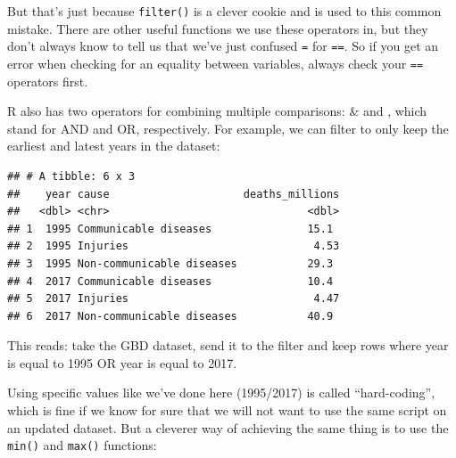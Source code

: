 \documentclass[
  12pt,
  krantz2]{krantz}
\makeatletter
\newenvironment{Shaded}{\begin{snugshade}}{\end{snugshade}}
\newcommand{\DecValTok}[1]{\textcolor[rgb]{0.00,0.00,0.81}{#1}}
\newcommand{\KeywordTok}[1]{\textcolor[rgb]{0.13,0.29,0.53}{\textbf{#1}}}
\newcommand{\NormalTok}[1]{#1}
\newcommand{\OperatorTok}[1]{\textcolor[rgb]{0.81,0.36,0.00}{\textbf{#1}}}
\newcommand{\StringTok}[1]{\textcolor[rgb]{0.31,0.60,0.02}{#1}}
\newenvironment{kframe}{%
\medskip{}
\setlength{\fboxsep}{.8em}
 \def\at@end@of@kframe{}%
 \ifinner\ifhmode%
  \def\at@end@of@kframe{\end{minipage}}%
  \begin{minipage}{\columnwidth}%
 \fi\fi%
 \def\FrameCommand##1{\hskip\@totalleftmargin \hskip-\fboxsep
 \colorbox{shadecolor}{##1}\hskip-\fboxsep
     \hskip-\linewidth \hskip-\@totalleftmargin \hskip\columnwidth}%
 \MakeFramed {\advance\hsize-\width
   \@totalleftmargin\z@ \linewidth\hsize
   \@setminipage}}%
 {\par\unskip\endMakeFramed%
 \at@end@of@kframe}
\renewenvironment{Shaded}{\begin{kframe}}{\end{kframe}}
\makeatother
\begin{document}
But that's just because \texttt{filter()} is a clever cookie and is used to this common mistake.
There are other useful functions we use these operators in, but they don't always know to tell us that we've just confused \texttt{=} for \texttt{==}.
So if you get an error when checking for an equality between variables, always check your \texttt{==} operators first.

R also has two operators for combining multiple comparisons: \& and \textbar, which stand for AND and OR, respectively.
For example, we can filter to only keep the earliest and latest years in the dataset:

\begin{Shaded}
\end{Shaded}

\begin{verbatim}
## # A tibble: 6 x 3
##    year cause                     deaths_millions
##   <dbl> <chr>                               <dbl>
## 1  1995 Communicable diseases               15.1 
## 2  1995 Injuries                             4.53
## 3  1995 Non-communicable diseases           29.3 
## 4  2017 Communicable diseases               10.4 
## 5  2017 Injuries                             4.47
## 6  2017 Non-communicable diseases           40.9
\end{verbatim}

This reads: take the GBD dataset, send it to the filter and keep rows where year is equal to 1995 OR year is equal to 2017.

Using specific values like we've done here (1995/2017) is called ``hard-coding'', which is fine if we know for sure that we will not want to use the same script on an updated dataset.
But a cleverer way of achieving the same thing is to use the \texttt{min()} and \texttt{max()} functions:

\begin{Shaded}
\end{Shaded}
\end{document}
